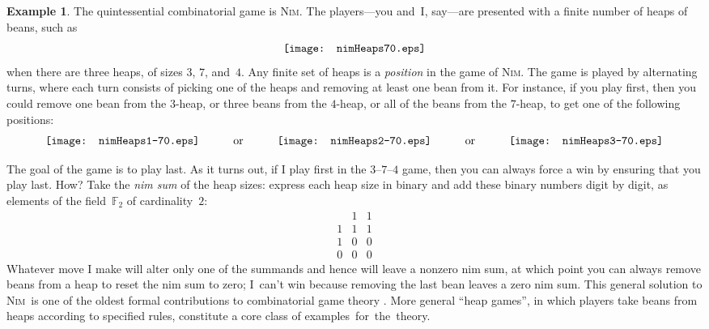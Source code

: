\documentclass[12pt]{amsart}
\numberwithin{equation}{section}
\theoremstyle{definition}
\newtheorem{example}[thm]{Example}
\begin{document}
\begin{example}\label{e:nim}
The quintessential combinatorial game is {\textsc{Nim}}.  The players---you
and~I, say---are presented with a finite number of heaps of beans,
such as
$$\begin{array}{@{}c@{}}\texttt{[image: nimHeaps70.eps]}\end{array}
$$
when there are three heaps, of sizes {\color{blue}$3$},
{\color{darkpurple}$7$}, and~{\color{darkgreen}$4$}.  Any finite set
of heaps is a \emph{position} in the game of {\textsc{Nim}}.  The game is played
by alternating turns, where each turn consists of picking one of the
heaps and removing at least one bean from it.  For instance, if you
play first, then you could remove one bean from the
{\color{blue}$3$}-heap, or three beans from the
{\color{darkgreen}$4$}-heap, or all of the beans from the
{\color{darkpurple}$7$}-heap, to get one of the following positions:
$$\begin{array}{@{}c@{}}\texttt{[image: nimHeaps1-70.eps]}\end{array}
\qquad\text{\quad or\quad}\qquad
\begin{array}{@{}c@{}}\texttt{[image: nimHeaps2-70.eps]}\end{array}
\qquad\text{\quad or\quad}\qquad
\begin{array}{@{}c@{}}\texttt{[image: nimHeaps3-70.eps]}\end{array}
$$

The goal of the game is to play last.  As it turns out, if I play
first in the
{\color{blue}$3$}--{\color{darkpurple}$7$}--{\color{darkgreen}$4$}
game, then you can always force a win by ensuring that you play last.
How?  Take the \emph{nim sum} of the heap sizes: express each heap
size in binary and add these binary numbers digit by digit, as
elements of the field~${\mathbb{F}}_2$ of cardinality~$2$:
$$\begin{array}{ccc}
       & 1 & 1
  \\ 1 & 1 & 1
  \\ 1 & 0 & 0
  \\\hline
     0 & 0 & 0
\end{array}
$$
Whatever move I make will alter only one of the summands and hence
will leave a nonzero nim sum, at which point you can always remove
beans from a heap to reset the nim sum to zero; I~can't win because
removing the last bean leaves a zero nim sum.  This general solution
to {\textsc{Nim}}\ is one of the oldest formal contributions to combinatorial
game theory \cite{nim}.  More general ``heap games'', in which players
take beans from heaps according to specified rules, constitute a core
class of examples~for~the~theory.
\end{example}
\end{document}
